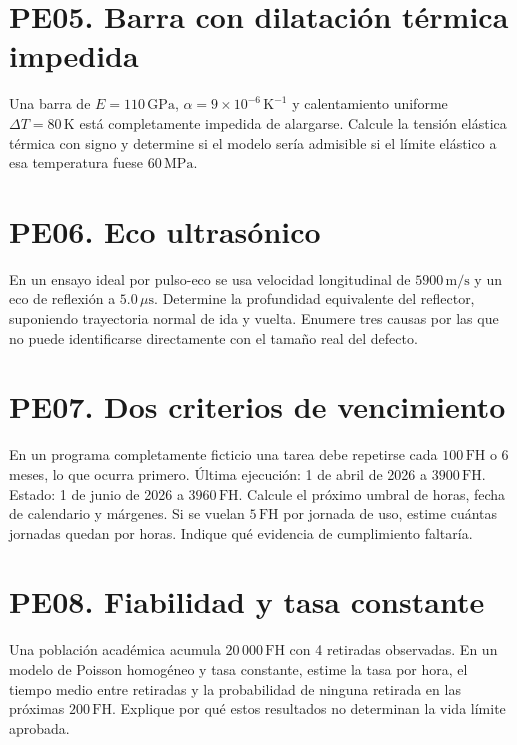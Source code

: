 \section*{PE05. Barra con dilatación térmica impedida}
Una barra de $E=110\,\mathrm{GPa}$, $\alpha=9\times10^{-6}\,\mathrm{K^{-1}}$ y calentamiento uniforme $\Delta T=80\,\mathrm K$ está completamente impedida de alargarse. Calcule la tensión elástica térmica con signo y determine si el modelo sería admisible si el límite elástico a esa temperatura fuese $60\,\mathrm{MPa}$.

\section*{PE06. Eco ultrasónico}
En un ensayo ideal por pulso-eco se usa velocidad longitudinal de $5900\,\mathrm{m/s}$ y un eco de reflexión a $5.0\,\mu\mathrm s$. Determine la profundidad equivalente del reflector, suponiendo trayectoria normal de ida y vuelta. Enumere tres causas por las que no puede identificarse directamente con el tamaño real del defecto.

\section*{PE07. Dos criterios de vencimiento}
En un programa completamente ficticio una tarea debe repetirse cada $100\,\mathrm{FH}$ o $6$ meses, lo que ocurra primero. Última ejecución: 1 de abril de 2026 a $3900\,\mathrm{FH}$. Estado: 1 de junio de 2026 a $3960\,\mathrm{FH}$. Calcule el próximo umbral de horas, fecha de calendario y márgenes. Si se vuelan $5\,\mathrm{FH}$ por jornada de uso, estime cuántas jornadas quedan por horas. Indique qué evidencia de cumplimiento faltaría.

\section*{PE08. Fiabilidad y tasa constante}
Una población académica acumula $20\,000\,\mathrm{FH}$ con 4 retiradas observadas. En un modelo de Poisson homogéneo y tasa constante, estime la tasa por hora, el tiempo medio entre retiradas y la probabilidad de ninguna retirada en las próximas $200\,\mathrm{FH}$. Explique por qué estos resultados no determinan la vida límite aprobada.
